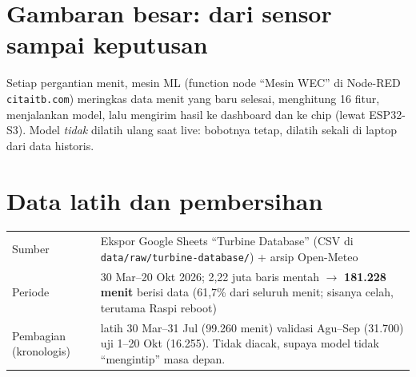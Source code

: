 \documentclass[10.5pt,a4paper]{article}
\newcommand{\cmd}[1]{\texttt{#1}}
\begin{document}
\section{Gambaran besar: dari sensor sampai keputusan}
\begin{center}
\end{center}
Setiap pergantian menit, mesin ML (function node ``Mesin WEC'' di Node-RED \cmd{citaitb.com}) meringkas data menit yang baru selesai,
menghitung 16 fitur, menjalankan model, lalu mengirim hasil ke dashboard dan ke chip (lewat ESP32-S3). Model \emph{tidak} dilatih ulang
saat live: bobotnya tetap, dilatih sekali di laptop dari data historis.

\section{Data latih dan pembersihan}
\begin{tabularx}{\linewidth}{@{}l X@{}}
\toprule
Sumber & Ekspor Google Sheets ``Turbine Database'' (CSV di \cmd{data/raw/turbine-database/}) + arsip Open-Meteo \\
Periode & 30 Mar--20 Okt 2026; 2,22 juta baris mentah $\to$ \textbf{181.228 menit} berisi data (61,7\% dari seluruh menit; sisanya celah, terutama Raspi reboot) \\
Pembagian (kronologis) & latih 30 Mar--31 Jul (99.260 menit) \textbullet{} validasi Agu--Sep (31.700) \textbullet{} uji 1--20 Okt (16.255). Tidak diacak, supaya model tidak ``mengintip'' masa depan. \\
\bottomrule
\end{tabularx}
\end{document}
